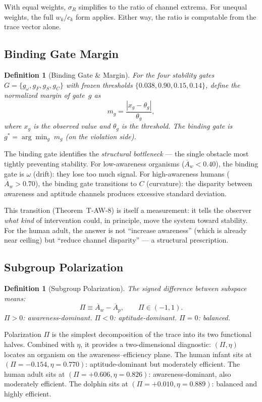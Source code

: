 \documentclass[
  aps,
  prd,
  twocolumn,
  superscriptaddress,
  nofootinbib,
  floatfix
]{revtex4-2}
\newtheorem{definition}[theorem]{Definition}
\newcommand{\beq}{\begin{equation}}
\newcommand{\eeq}{\end{equation}}
\newcommand{\Aw}{\overline{A}_{\!w}}
\newcommand{\Ap}{\overline{A}_{\!p}}
\begin{document}
With equal weights, $\sigma_R$ simplifies to the ratio
of channel extrema.  For unequal weights, the full
$w_k/c_k$ form applies.  Either way, the ratio is
computable from the trace vector alone.

\subsection{Binding Gate Margin}

\begin{definition}[Binding Gate \& Margin]\label{def:binding}
For the four stability gates $G = \{g_\omega, g_F, g_S, g_C\}$
with frozen thresholds $\{0.038, 0.90, 0.15, 0.14\}$,
define the normalized margin of gate~$g$ as
\beq\label{eq:margin}
  m_g = \frac{|x_g - \theta_g|}{\theta_g},
\eeq
where $x_g$ is the observed value and $\theta_g$ is the
threshold.  The \emph{binding gate} is
$g^* = \arg\min_g\; m_g$ (on the violation side).
\end{definition}

The binding gate identifies the \emph{structural bottleneck}
--- the single obstacle most tightly preventing stability.
For low-awareness organisms ($\Aw < 0.40$), the binding
gate is $\omega$ (drift): they lose too much signal.  For
high-awareness humans ($\Aw > 0.70$), the binding gate
transitions to $C$ (curvature): the disparity between
awareness and aptitude channels produces excessive
standard deviation.

This transition (Theorem~T-AW-8) is itself a measurement:
it tells the observer \emph{what kind} of intervention
could, in principle, move the system toward stability.
For the human adult, the answer is not ``increase
awareness'' (which is already near ceiling) but ``reduce
channel disparity'' --- a structural prescription.

\subsection{Subgroup Polarization}

\begin{definition}[Subgroup Polarization]\label{def:polar}
The signed difference between subspace means:
\beq\label{eq:polar}
  \Pi \equiv \Aw - \Ap,
  \qquad \Pi \in (-1, 1).
\eeq
$\Pi > 0$: awareness-dominant.
$\Pi < 0$: aptitude-dominant.  $\Pi = 0$: balanced.
\end{definition}

Polarization $\Pi$ is the simplest decomposition of the
trace into its two functional halves.  Combined with
$\eta$, it provides a two-dimensional diagnostic:
$(\Pi, \eta)$ locates an organism on the
awareness--efficiency plane.  The human infant sits at
$(\Pi = -0.154, \eta = 0.770)$: aptitude-dominant but
moderately efficient.  The human adult sits at
$(\Pi = +0.606, \eta = 0.826)$: awareness-dominant,
also moderately efficient.  The dolphin sits at
$(\Pi = +0.010, \eta = 0.889)$: balanced and
highly efficient.
\end{document}
